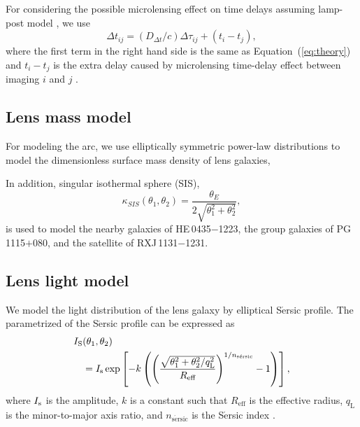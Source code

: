 \documentclass[useAMS,usenatbib]{mnras}
\newcommand\rxj{RXJ\,1131$-$1231}
\newcommand\he{HE\,0435$-$1223}
\newcommand\pg{PG\,1115$+$080}
\newcommand{\sref}[1]{Section~\ref{#1}}
\newcommand{\eref}[1]{Equation~(\ref{#1})}
\newcommand{\Ddt}{{D_{\Delta t}}}
\begin{document}
For considering the possible microlensing effect on time delays assuming lamp-post model , we use \begin{equation}
\label{eq:TDsum}
\Delta t_{ij}=(\Ddt/c)\Delta\tau_{ij}+(t_{i}-t_{j}),
\end{equation}
where the first term in the right hand side is the same as \eref{eq:theory} and $t_{i}-t_{j}$ is the extra delay caused by microlensing time-delay effect between imaging $i$ and $j$ \citep[see detail in][]{GChenEtal18a}.

\subsection{Lens mass model}
\label{sec:mass_model}
For modeling the arc, we use elliptically symmetric power-law 
distributions to model the dimensionless surface mass density of 
lens galaxies,



 In addition, singular isothermal sphere (SIS),
\begin{equation}
\kappa_{SIS}(\theta_{1},\theta_{2}) = \frac{\theta_{E}}{2\sqrt{\theta_{1}^{2}+\theta_{2}^{2}}},
\end{equation}
is used to model the nearby galaxies of \he, the group galaxies of \pg, and the satellite of \rxj.


\subsection{Lens light model}
\label{sec:light_model}
We model the light distribution of the lens galaxy by elliptical S$\acute{\text{e}}$rsic profile. The parametrized of the S$\acute{\text{e}}$rsic profile can be expressed as
\begin{equation}\label{eq:sersic}
\begin{split}
I_{\rm S}&(\theta_{1},\theta_{2}) \\
&=I_{\rm s}\,\mathrm{exp}\left[-k\left(\left(\frac{\sqrt{\theta_{1}^{2}+\theta_{2}^{2}/q_{\text{L}}^{2}}}{R_{\text{eff}}}\right)^{1/n_{\text{s}\acute{\text{e}}\text{rsic}}}-1\right)\right],
\end{split}
\end{equation}
where $I_{\rm s}$ is the amplitude, $k$ is a constant such that
$R_{\text{eff}}$ is the effective radius, $q_{\text{L}}$ is the minor-to-major axis ratio, and $n_{\text{s}\acute{\text{e}}\text{rsic}}$ is the
S$\acute{\text{e}}$rsic index \citep{Sersic68}. 
\end{document}
